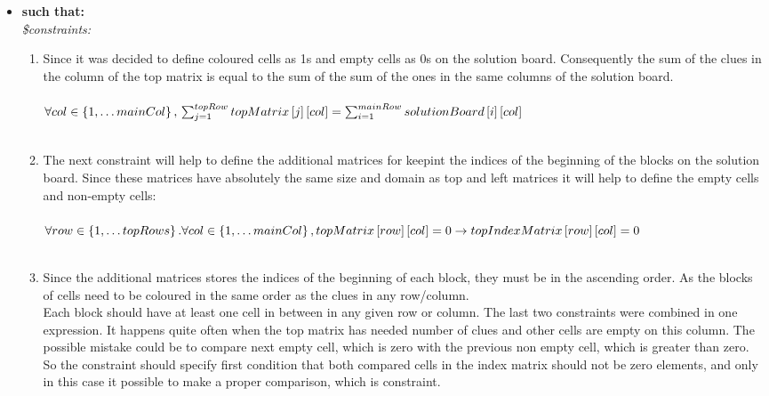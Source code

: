 \begin{itemize}
	\item \textbf{such that:}\\
	\textit{\$constraints:}\\
	\begin{enumerate}
		\item Since it was decided to define coloured cells as 1s and empty cells as 0s on the solution board. Consequently the sum of the clues in the column of the top matrix is equal to the sum of the sum of the ones in the same columns of the solution board.\\~\\ 
		
		$\forall col\in \left\{ 1,\ldots mainCol\right\} ,\\\sum _{j=1}^{topRow}topMatrix\left[ j\right]\left[ col\right] =\sum _{i=1}^{mainRow}solutionBoard\left[ i\right]\left[col\right] $\\~\\
		
		\item The next constraint will help to define the additional matrices for keepint the indices of the beginning of the blocks on the solution board. Since these matrices have absolutely the same size and domain as top and left matrices it will help to define the empty cells and non-empty cells:\\~\\

		$\forall row\in \left\{ 1,\ldots topRows\right\}.\\\forall col\in \left\{ 1,\ldots mainCol\right\}, \\topMatrix\left[ row\right]\left[ col\right] = 0 \rightarrow topIndexMatrix\left[ row\right]\left[ col\right] = 0$\\~\\

		\item Since the additional matrices stores the indices of the beginning of each block, they must be in the ascending order. As the blocks of cells need to be coloured in the same order as the clues in any row/column. \\

		Each block should have at least one cell in between in any given row or column. The last two constraints were combined in one expression.
		It happens quite often when the top matrix has needed number of clues and other cells are empty on this column. The possible mistake could be to compare next empty cell, which is zero with the previous non empty cell, which is greater than zero. So the constraint should specify first condition that both compared cells in the index matrix should not be zero elements, and only in this case it possible to make a proper comparison, which is constraint. \\


\end{enumerate}
\end{itemize}
